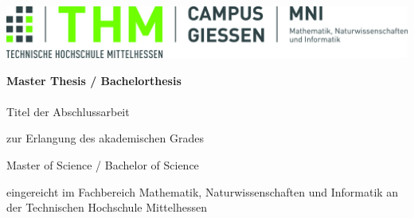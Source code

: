 
\begin{titlepage}

\begin{center}
\includegraphics[width=1\textwidth]{images/Logo_THM_MNI.jpg}
\par\end{center}


\noindent \begin{center}
\vspace{1cm}

\par\end{center}

\noindent \begin{center}
\textsf{\textbf{\huge Master Thesis / Bachelorthesis}}\textsf{}\\
\textsf{}\\
\textsf{\Large Titel der Abschlussarbeit}
\par\end{center}{\Large \par}

\vspace{1cm}


\begin{center}
zur Erlangung des akademischen Grades
\par\end{center}

\begin{center}
{\textsf{\large Master of Science / Bachelor of Science}}
\par\end{center}{\large \par}

\begin{center}
eingereicht im Fachbereich Mathematik, Naturwissenschaften und Informatik an der Technischen Hochschule Mittelhessen{\large \vspace{1cm}
}
\par\end{center}{\large \par}


\end{titlepage}
